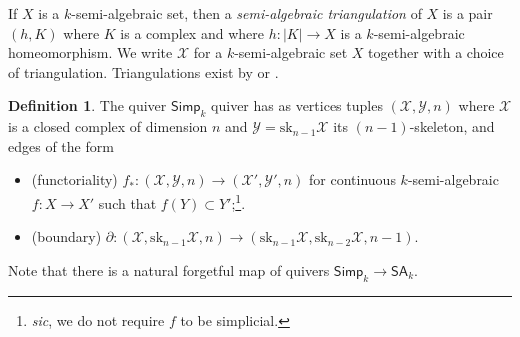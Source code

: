 \documentclass[11pt,a4paper]{amsart}
\theoremstyle{definition}
\newtheorem{defn}[lemma]{Definition}
\newtheorem{rem}[lemma]{Remark}
\newcommand{\Xh}{\mathcal{X}}
\newcommand{\Yh}{\mathcal{Y}}
\newcommand{\sk}{\mathrm{sk}}
\newcommand{\SA}{\mathsf{SA}}
\newcommand{\GSA}{\mathsf{GSA}}
\newcommand{\Simp}{\mathsf{Simp}}
\newcommand{\R}{\mathbb{R}}
\begin{document}
If $X$ is a $k$-semi-algebraic set, then a 
 \emph{semi-algebraic triangulation} of $X$ is a pair
$(h,K)$ where $K$ is a complex and where
$h:|K|\rightarrow X$ is a $k$-semi-algebraic  homeomorphism.
We write $\Xh$ for a $k$-semi-algebraic set $X$ together with a choice of
triangulation. Triangulations exist by \cite[Theorem~9.2.1]{BCR} or \cite[Theorem~8.2.9]{D:oMin}.


\begin{defn}
%
The quiver $\Simp_k$ quiver has as  vertices tuples $(\Xh,\Yh,n)$ where
$\Xh$ is a closed complex of dimension $n$ and $\Yh=\sk_{n-1}\Xh$ its $(n-1)$-skeleton, and edges of the form
\begin{itemize}
\item (functoriality) $f_*:(\Xh,\Yh,n)\to (\Xh',\Yh',n)$ for continuous
$k$-semi-algebraic $f:X\to X'$ such that $f(Y)\subset Y'$;\footnote{\emph{sic}, we do not require $f$ to be simplicial.}.
\item (boundary) $\partial: (\Xh,\sk_{n-1}\Xh,n)\to (\sk_{n-1}\Xh,\sk_{n-2}\Xh,n-1)$. 
\end{itemize}





\end{defn}
Note that there is a natural forgetful map of quivers $\Simp_k\to \SA_k$.
%
\end{document}
